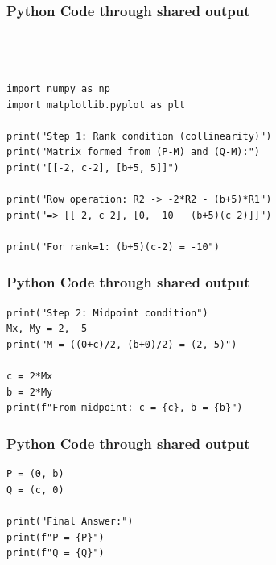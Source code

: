 \documentclass{beamer}
\begin{document}
 \begin{frame}[fragile]
	\frametitle{Python Code through shared output}
	\begin{lstlisting}       



import numpy as np
import matplotlib.pyplot as plt

print("Step 1: Rank condition (collinearity)")
print("Matrix formed from (P-M) and (Q-M):")
print("[[-2, c-2], [b+5, 5]]")

print("Row operation: R2 -> -2*R2 - (b+5)*R1")
print("=> [[-2, c-2], [0, -10 - (b+5)(c-2)]]")

print("For rank=1: (b+5)(c-2) = -10")
\end{lstlisting}
\end{frame}

\begin{frame}[fragile]\frametitle{Python Code through shared output}
\begin{lstlisting}
print("Step 2: Midpoint condition")
Mx, My = 2, -5
print("M = ((0+c)/2, (b+0)/2) = (2,-5)")

c = 2*Mx
b = 2*My
print(f"From midpoint: c = {c}, b = {b}")
\end{lstlisting}
\end{frame}


\begin{frame}[fragile]\frametitle{Python Code through shared output}
\begin{lstlisting}
P = (0, b)
Q = (c, 0)

print("Final Answer:")
print(f"P = {P}")
print(f"Q = {Q}")
\end{lstlisting}
\end{frame}
\end{document}
